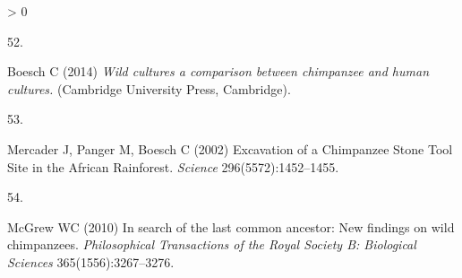 \documentclass[9pt,twocolumn,twoside,]{pnas-new}
\newlength{\csllabelwidth}
\newlength{\cslhangindent}
\newenvironment{CSLReferences}[3] %
 {%
  \setlength{\parindent}{0pt}
  \ifodd #1 \everypar{\setlength{\hangindent}{\cslhangindent}}\ignorespaces\fi
  \ifnum #2 > 0
  \setlength{\parskip}{#2\baselineskip}
  \fi
 }%
 {}
\newcommand{\CSLLeftMargin}[1]{\parbox[t]{\csllabelwidth}{#1}}
\newcommand{\CSLRightInline}[1]{\parbox[t]{\linewidth - \csllabelwidth}{#1}}
\begin{document}
\begin{CSLReferences}{0}{0}
\leavevmode\hypertarget{ref-boeschWildCulturesComparison2014}{}%
\CSLLeftMargin{52. }
\CSLRightInline{Boesch C (2014) \emph{Wild cultures a comparison between
chimpanzee and human cultures.} ({Cambridge University Press},
{Cambridge}).}

\leavevmode\hypertarget{ref-mercaderExcavationChimpanzeeStone2002}{}%
\CSLLeftMargin{53. }
\CSLRightInline{Mercader J, Panger M, Boesch C (2002) Excavation of a
{Chimpanzee Stone Tool Site} in the {African Rainforest}. \emph{Science}
296(5572):1452--1455.}

\leavevmode\hypertarget{ref-mcgrewSearchLastCommon2010}{}%
\CSLLeftMargin{54. }
\CSLRightInline{McGrew WC (2010) In search of the last common ancestor:
New findings on wild chimpanzees. \emph{Philosophical Transactions of
the Royal Society B: Biological Sciences} 365(1556):3267--3276.}

\end{CSLReferences}



% 
\end{document}
